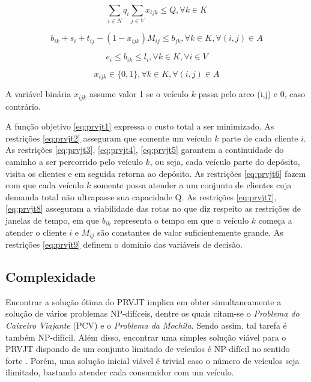 \begin{equation} \label{eq:prvjt6}
\sum_{i \in N} q_i \sum_{j \in V} x_{ijk} \leq Q, \forall k \in K
\end{equation}

\begin{equation} \label{eq:prvjt7}
b_{ik} + s_i + t_{ij} -(1-x_{ijk})M_{ij} \leq b_{jk},\forall k \in K, \forall (i,j) \in A
\end{equation}

\begin{equation} \label{eq:prvjt8}
e_i \leq b_{ik} \leq l_i,\forall k \in K,\forall i \in V
\end{equation}

\begin{equation} \label{eq:prvjt9}
x_{ijk} \in \{0,1\},\forall k \in K,\forall (i,j) \in A
\end{equation}

A variável binária \(x_{ijk}\) assume valor 1 se o veículo \(k\) passa pelo arco (i,j) e 0, caso contrário.

A função objetivo \ref{eq:prvjt1} expressa o custo total a ser minimizado. As restrições \ref{eq:prvjt2} asseguram que somente um veículo \(k\) parte de cada cliente \(i\). As restrições \ref{eq:prvjt3}, \ref{eq:prvjt4}, \ref{eq:prvjt5} garantem a continuidade do caminho a ser percorrido pelo veículo \(k\), ou seja, cada veículo parte do depósito, visita os clientes e em seguida retorna ao depósito. As restrições \ref{eq:prvjt6} fazem com que cada veículo \(k\) somente possa atender a um conjunto de clientes cuja demanda total não ultrapasse sua capacidade Q. As restrições \ref{eq:prvjt7}, \ref{eq:prvjt8} asseguram a viabilidade das rotas no que diz respeito as restrições de janelas de tempo, em que \(b_{ik}\) representa o tempo em que o veículo \(k\) começa a atender o cliente \(i\) e \(M_{ij}\) são constantes de valor suficientemente grande.  As restrições \ref{eq:prvjt9} definem o domínio das variáveis de decisão.~\cite{CORDEAU}


\subsection{Complexidade}

Encontrar a solução ótima do PRVJT implica em obter simultaneamente a solução de vários problemas NP-difíceis, dentre os quais citam-se o \textit{Problema do Caixeiro Viajante} (PCV) e o \textit{Problema da Mochila}. Sendo assim, tal tarefa é também NP-difícil. Além disso, encontrar uma simples solução viável para o PRVJT dispondo de um conjunto limitado de veículos é NP-difícil no sentido forte \cite{Kohl}. Porém, uma solução inicial viável é trivial caso o número de veículos seja ilimitado, bastando atender cada consumidor com um veículo.

